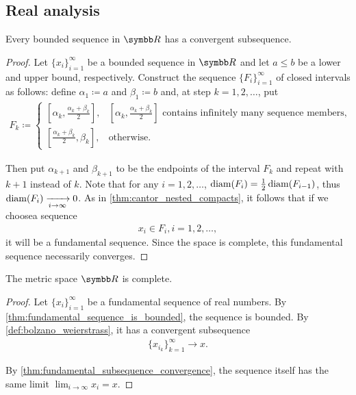 \subsection{Real analysis}\label{subsec:real_analysis}

\begin{theorem}\label{def:bolzano_weierstrass}
  Every bounded sequence in \( \BB{R} \) has a convergent subsequence.
\end{theorem}
\begin{proof}
  Let \( \{ x_i \}_{i=1}^\infty \) be a bounded sequence in \( \BB{R} \) and let \( a \leq b \) be a lower and upper bound, respectively. Construct the sequence \( \{ F_i \}_{i=1}^\infty \) of closed intervals as follows: define \( \alpha_1 \coloneqq a \) and \( \beta_1 \coloneqq b \) and, at step \( k = 1, 2, \ldots \), put
  \begin{align*}
    F_k \coloneqq \begin{cases}
      [\alpha_k, \tfrac{\alpha_k+\beta_k} 2], &[\alpha_k, \tfrac{\alpha_k+\beta_k} 2]\text{ contains infinitely many sequence members}, \\
      [\tfrac{\alpha_k+\beta_k} 2, \beta_k], &\text{otherwise}.
    \end{cases}
  \end{align*}

  Then put \( \alpha_{k+1} \) and \( \beta_{k+1} \) to be the endpoints of the interval \( F_k \) and repeat with \( k+1 \) instead of \( k \). Note that for any \( i = 1, 2, \ldots \), \( \operatorname{diam}(F_i) = \tfrac 1 2 \operatorname{diam}(F_{i-1}) \), thus \( \operatorname{diam}(F_i) \xrightarrow[i \to \infty]{} 0 \). As in \cref{thm:cantor_nested_compacts}, it follows that if we choose\AOC a sequence
  \begin{align*}
    x_i \in F_i, i = 1, 2, \ldots,
  \end{align*}
  it will be a fundamental sequence. Since the space is complete, this fundamental sequence necessarily converges.
\end{proof}

\begin{theorem}\label{def:real_numbers_complete_metric_space}
  The metric space \( \BB{R} \) is complete.
\end{theorem}
\begin{proof}
  Let \( \{ x_i \}_{i=1}^\infty \) be a fundamental sequence of real numbers. By \cref{thm:fundamental_sequence_is_bounded}, the sequence is bounded. By \cref{def:bolzano_weierstrass}, it has a convergent subsequence
  \begin{align*}
    \{ x_{i_k} \}_{k=1}^\infty \to x.
  \end{align*}

  By \cref{thm:fundamental_subsequence_convergence}, the sequence itself has the same limit \( \lim_{i \to \infty} x_i = x \).
\end{proof}
